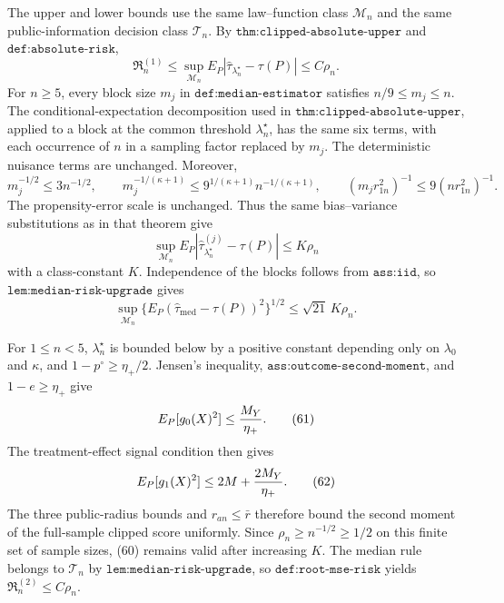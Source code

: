 The upper and lower bounds use the same law--function class \(\mathcal M_n\) and the same public-information decision class \(\mathcal T_n\).  By \(\texttt{thm:clipped-absolute-upper}\) and \(\texttt{def:absolute-risk}\),
\[
\mathfrak R_n^{(1)}
\leq\sup_{\mathcal M_n}E_P|\widehat\tau_{\lambda_n^\star}-\tau(P)|
\leq C\rho_n.                                                           \tag{57}
\]
For \(n\geq5\), every block size \(m_j\) in \(\texttt{def:median-estimator}\) satisfies \(n/9\leq m_j\leq n\).  The conditional-expectation decomposition used in \(\texttt{thm:clipped-absolute-upper}\), applied to a block at the common threshold \(\lambda_n^\star\), has the same six terms, with each occurrence of \(n\) in a sampling factor replaced by \(m_j\).  The deterministic nuisance terms are unchanged.  Moreover,
\[
m_j^{-1/2}\leq3n^{-1/2},\qquad
m_j^{-1/(\kappa+1)}\leq9^{1/(\kappa+1)}n^{-1/(\kappa+1)},\qquad
(m_jr_{1n}^2)^{-1}\leq9(nr_{1n}^2)^{-1}.                                 \tag{58}
\]
The propensity-error scale is unchanged.  Thus the same bias--variance substitutions as in that theorem give
\[
\sup_{\mathcal M_n}E_P|\widehat\tau_{\lambda_n^\star}^{(j)}-\tau(P)|
\leq K\rho_n                                                            \tag{59}
\]
with a class-constant \(K\).  Independence of the blocks follows from \(\texttt{ass:iid}\), so \(\texttt{lem:median-risk-upgrade}\) gives
\[
\sup_{\mathcal M_n}
\{E_P(\widehat\tau_{\mathrm{med}}-\tau(P))^2\}^{1/2}
\leq\sqrt{21}\,K\rho_n.                                                \tag{60}
\]

For \(1\leq n<5\), \(\lambda_n^\star\) is bounded below by a positive constant depending only on \(\lambda_0\) and \(\kappa\), and \(1-p^\circ\geq\eta_+/2\).  Jensen's inequality, \(\texttt{ass:outcome-second-moment}\), and \(1-e\geq\eta_+\) give
\[
E_P[g_0(X)^2]\leq {M_Y\over\eta_+}.                                     \tag{61}
\]
The treatment-effect signal condition then gives
\[
E_P[g_1(X)^2]\leq2M+{2M_Y\over\eta_+}.                                  \tag{62}
\]
The three public-radius bounds and \(r_{an}\leq\bar r\) therefore bound the second moment of the full-sample clipped score uniformly.  Since \(\rho_n\geq n^{-1/2}\geq1/2\) on this finite set of sample sizes, (60) remains valid after increasing \(K\).  The median rule belongs to \(\mathcal T_n\) by \(\texttt{lem:median-risk-upgrade}\), so \(\texttt{def:root-mse-risk}\) yields \(\mathfrak R_n^{(2)}\leq C\rho_n\).

